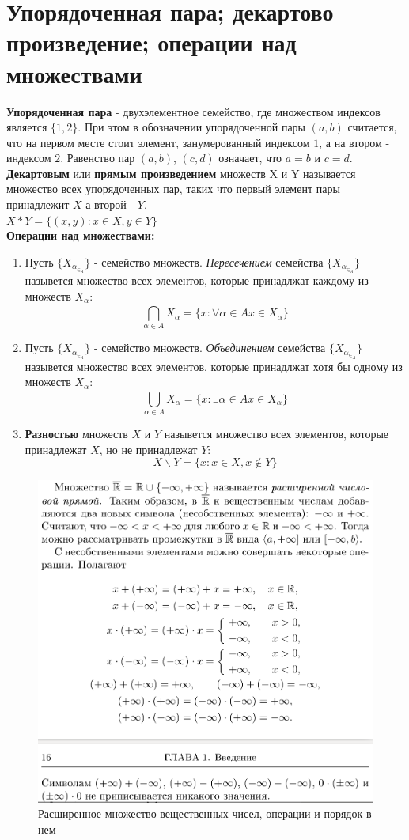 \documentclass[12pt, a4paper]{article}
\begin{document}
 
\section{Упорядоченная пара; декартово произведение; операции над множествами}
	\textbf{Упорядоченная пара} - двухэлементное семейство, где множеством индексов является $\{1, 2\}$. При этом в обозначении упорядоченной пары $(a,b)$ считается, что на первом месте стоит элемент, занумерованный индексом $1$, а на втором - индексом $2$. Равенство пар $(a, b)$, $(c, d)$ означает, что $a = b$ и $c = d$.\\
	\textbf{Декартовым} или \textbf{прямым произведением} множеств X и Y называется множество всех упорядоченных пар, таких что первый элемент пары принадлежит $X$ а второй - $Y$.\\
	$X*Y = \{(x, y) : x \in X, y \in Y\}$\\
	\textbf{Операции над множествами:}
	\begin{enumerate}
		\item Пусть $\{X_\alpha _\in _A \}$ - семейство множеств. \textit{Пересечением} семейства $\{X_\alpha _\in _A\}$ назывется множество всех элементов, которые принадлжат каждому из множеств $X_\alpha$:
		$$\bigcap\limits_{\alpha \in A}^{} X_\alpha = \{x : \forall \alpha \in A x \in X_\alpha \}$$
		\item Пусть $\{X_\alpha _\in _A \}$ - семейство множеств. \textit{Объединением} семейства $\{X_\alpha _\in _A\}$ назывется множество всех элементов, которые принадлжат хотя бы одному из множеств $X_\alpha$:
		$$\bigcup\limits_{\alpha \in A}^{} X_\alpha = \{x : \exists \alpha \in A x \in X_\alpha \}$$
		\item \textbf{Разностью} множеств $X$ и $Y$ назывется множество всех элементов, которые принадлежат $X$, но не принадлежат $Y$:
		$$X \backslash Y = \{x : x \in X, x \notin Y \}$$
	\end{enumerate}
\begin{figure}[h]
    \centering
    \caption{Расширенное множество вещественных чисел, операции и порядок в нем}
    \includegraphics[width=0.8\linewidth]{imagesMin/2.png}
\end{figure}
\end{document}
